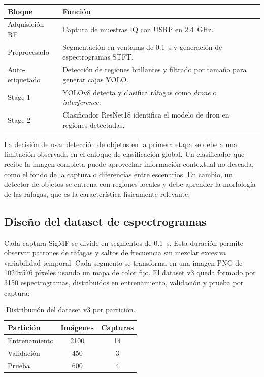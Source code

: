 \begin{center}
\begin{tabular}{p{}p{}}
\toprule
\textbf{Bloque} & \textbf{Función} \\
\midrule
Adquisición RF & Captura de muestras IQ con USRP en \SI{2.4}{\giga\hertz}. \\
Preprocesado & Segmentación en ventanas de \SI{0.1}{\second} y generación de espectrogramas STFT. \\
Auto-etiquetado & Detección de regiones brillantes y filtrado por tamaño para generar cajas YOLO. \\
Stage 1 & YOLOv8 detecta y clasifica ráfagas como \emph{drone} o \emph{interference}. \\
Stage 2 & Clasificador ResNet18 identifica el modelo de dron en regiones detectadas. \\
\bottomrule
\end{tabular}
\end{center}

La decisión de usar detección de objetos en la primera etapa se debe a una limitación observada en el enfoque de clasificación global. Un clasificador que recibe la imagen completa puede aprovechar información contextual no deseada, como el fondo de la captura o diferencias entre escenarios. En cambio, un detector de objetos se entrena con regiones locales y debe aprender la morfología de las ráfagas, que es la característica físicamente relevante.

\subsection{Diseño del dataset de espectrogramas}
\label{subsec:diseno_dataset}

Cada captura SigMF se divide en segmentos de \SI{0.1}{\second}. Esta duración permite observar patrones de ráfagas y saltos de frecuencia sin mezclar excesiva variabilidad temporal. Cada segmento se transforma en una imagen PNG de \num{1024}x\num{576} píxeles usando un mapa de color fijo. El dataset v3 queda formado por \num{3150} espectrogramas, distribuidos en entrenamiento, validación y prueba por captura:

\begin{table}[htbp]
\centering
\caption{Distribución del dataset v3 por partición.}
\label{tab:dataset_v3}
\begin{tabular}{lcc}
\toprule
\textbf{Partición} & \textbf{Imágenes} & \textbf{Capturas} \\
\midrule
Entrenamiento & 2100 & 14 \\
Validación & 450 & 3 \\
Prueba & 600 & 4 \\
\bottomrule
\end{tabular}
\end{table}

